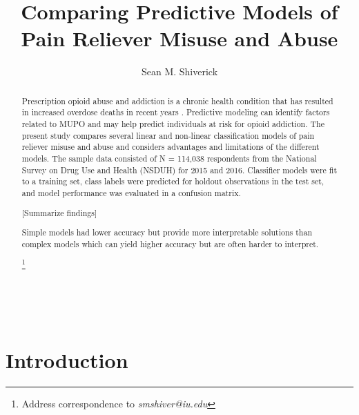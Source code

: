 \\\documentclass[sigconf]{acmart}
\begin{document}
  \title{Comparing Predictive Models of Pain Reliever Misuse and Abuse}
  \author{Sean M. Shiverick}
\renewcommand{\shortauthors}{S.M. Shiverick}


\begin{abstract}

Prescription opioid abuse and addiction is a chronic health condition that 
has resulted in increased overdose deaths in recent years \cite{nida18}. 
Predictive modeling can identify factors related to MUPO and may help predict 
individuals at risk for opioid addiction. The present study compares several 
linear and non-linear classification models of pain reliever misuse and abuse 
and considers advantages and limitations of the different models. The sample 
data consisted of N = 114,038 respondents from the National Survey on Drug Use 
and Health (NSDUH) for 2015 and 2016. Classifier models were fit to a training 
set, class labels were predicted for holdout observations in the test set, and 
model performance was evaluated in a confusion matrix. 

[Summarize findings]

Simple models had lower accuracy but provide more interpretable solutions 
than complex models which can yield higher accuracy but are often harder 
to interpret.   

\footnote{ Address correspondence to \textit{smshiver@iu.edu}}
\end{abstract}
\maketitle

\section{Introduction}
\end{document}
